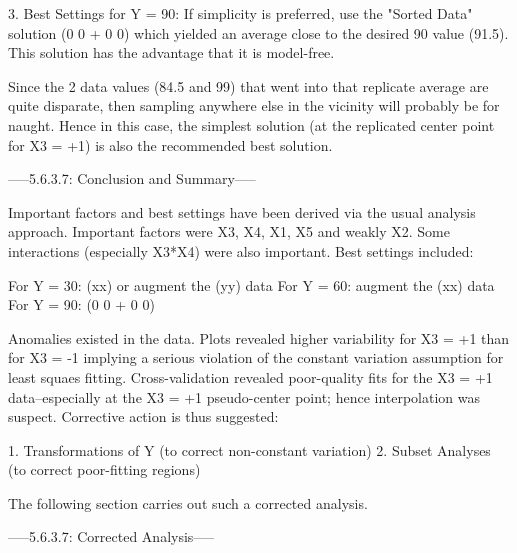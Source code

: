 3. Best Settings for Y = 90:
   If simplicity is preferred, use the "Sorted Data"
   solution (0 0 + 0 0) which yielded an average close to
   the desired 90 value (91.5).  This solution has the
   advantage that it is model-free.

   Since the 2 data values (84.5 and 99) that went into that
   replicate average are quite disparate, then sampling
   anywhere else in the vicinity will probably be for
   naught.  Hence in this case, the simplest solution (at
   the replicated center point for X3 = +1) is also the
   recommended best solution.

-----5.6.3.7: Conclusion and Summary-----

Important factors and best settings have been derived via 
the usual analysis approach.  Important factors were X3, X4,
X1, X5 and weakly X2.  Some interactions (especially X3*X4) 
were also important.  Best settings included: 

   For Y = 30: (xx) or augment the (yy) data
   For Y = 60: augment the (xx) data
   For Y = 90: (0 0 + 0 0)

Anomalies existed in the data.  Plots revealed higher 
variability for X3 = +1 than for X3 = -1 implying a serious 
violation of the constant variation assumption for least 
squaes fitting.  Cross-validation revealed poor-quality fits
for the X3 = +1 data--especially at the X3 = +1 
pseudo-center point; hence interpolation was suspect.  
Corrective action is thus suggested: 

   1. Transformations of Y (to correct non-constant variation)
   2. Subset Analyses (to correct poor-fitting regions)

The following section carries out such a corrected analysis. 


-----5.6.3.7: Corrected Analysis-----

